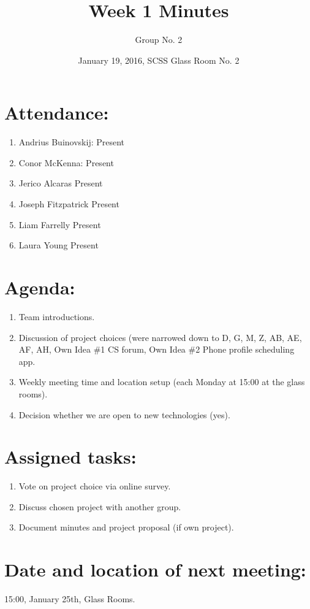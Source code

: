 \documentclass[a4paper, 12pt]{article}
\begin{document}
\title{Week 1 Minutes}
\author{Group No. 2}
\date{January 19, 2016, SCSS Glass Room No. 2}
\maketitle

	\section{Attendance:}
		\begin{enumerate}
			\item Andrius Buinovskij:	\dotfill Present
			\item Conor McKenna:		\dotfill Present
			\item Jerico Alcaras		\dotfill Present
			\item Joseph Fitzpatrick	\dotfill Present
			\item Liam Farrelly		\dotfill Present
			\item Laura Young		\dotfill Present
		\end{enumerate}

	\section{Agenda:}
		\begin{enumerate}
			\item Team introductions.
			\item Discussion of project choices (were narrowed down to D, G, M, Z, AB, AE, AF, AH, 
								Own Idea \#1 CS forum, Own Idea \#2 Phone profile scheduling app.
			\item Weekly meeting time and location setup (each Monday at 15:00 at the glass rooms).
			\item Decision whether we are open to new technologies (yes).

		\end{enumerate}

	\section{Assigned tasks:}
		\begin{enumerate}
			\item Vote on project choice via online survey.
			\item Discuss chosen project with another group.
			\item Document minutes and project proposal (if own project).
		\end{enumerate}

	\section{Date and location of next meeting:}
		15:00, January 25th, Glass Rooms.
\end{document}
